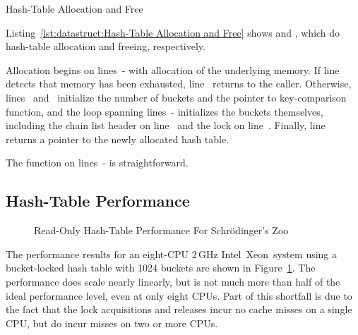 \begin{listing}[tb]

\caption{Hash-Table Allocation and Free}
\label{lst:datastruct:Hash-Table Allocation and Free}
\end{listing}

Listing~\ref{lst:datastruct:Hash-Table Allocation and Free}
shows  and ,
which do hash-table allocation and freeing, respectively.
\begin{lineref}
Allocation begins on
lines~- with allocation of the underlying memory.
If line~ detects that memory has been exhausted,
line~ returns
 to the caller.
Otherwise, lines~ and~ initialize
the number of buckets and the pointer to key-comparison function,
and the loop
spanning lines~- initializes the buckets themselves,
including the chain list header on
line~ and the lock on line~.
Finally, line~ returns a pointer to the newly allocated hash table.
\end{lineref}
\begin{lineref}
The  function on
lines~- is straightforward.
\end{lineref}

\subsection{Hash-Table Performance}
\label{sec:datastruct:Hash-Table Performance}

\begin{figure}[tb]
\centering
{}
\caption{Read-Only Hash-Table Performance For Schr\"odinger's Zoo}
\label{fig:datastruct:Read-Only Hash-Table Performance For Schroedinger's Zoo}
\end{figure}

The performance results for an eight-CPU 2\,GHz
Intel\mytextregistered\
Xeon\mytextregistered\
system using a bucket-locked hash table with 1024 buckets are shown in
Figure~\ref{fig:datastruct:Read-Only Hash-Table Performance For Schroedinger's Zoo}.
The performance does scale nearly linearly, but is not much more than half
of the ideal performance level, even at only eight CPUs.
Part of this shortfall is due to the fact that the lock acquisitions and
releases incur no cache misses on a single CPU, but do incur misses
on two or more CPUs.

